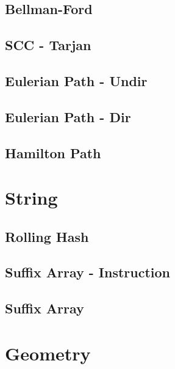 \documentclass[twocolumn]{article}
\begin{document}
\subsection{Bellman-Ford}


\subsection{SCC - Tarjan}


\subsection{Eulerian Path - Undir}


\subsection{Eulerian Path - Dir}


\subsection{Hamilton Path}




\section{String}

\subsection{Rolling Hash}


\subsection{Suffix Array - Instruction}


\subsection{Suffix Array}


\section{Geometry}
\end{document}
